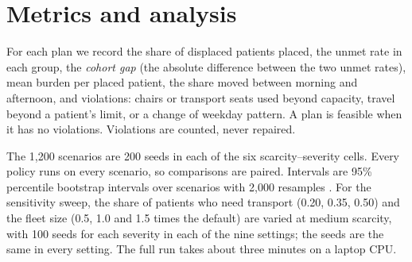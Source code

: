 \documentclass[11pt,a4paper]{article}
\begin{document}
\section{Metrics and analysis}
For each plan we record the share of displaced patients placed, the unmet rate in each group, the
\emph{cohort gap} (the absolute difference between the two unmet rates), mean burden per placed patient,
the share moved between morning and afternoon, and violations: chairs or transport seats used beyond
capacity, travel beyond a patient's limit, or a change of weekday pattern. A plan is feasible when it has no
violations. Violations are counted, never repaired.

The 1,200 scenarios are 200 seeds in each of the six scarcity--severity cells. Every policy runs on every
scenario, so comparisons are paired. Intervals are 95\% percentile bootstrap intervals over scenarios with
2,000 resamples \citep{efron1993bootstrap}. For the sensitivity sweep, the share of patients who need transport
(0.20, 0.35, 0.50) and the fleet size (0.5, 1.0 and 1.5 times the default) are varied at medium scarcity, with
100 seeds for each severity in each of the nine settings; the seeds are the same in every setting. The full run
takes about three minutes on a laptop CPU.
\end{document}
